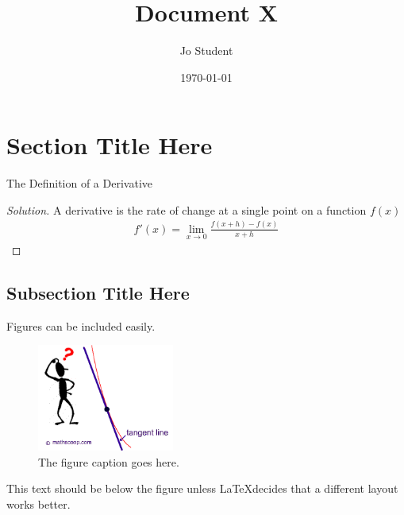 \documentclass[aps,pra,notitlepage,amsmath,amssymb,letterpaper,12pt]{revtex4-1}
\newenvironment{problem}[2][Problem]{\begin{trivlist}
\item[\hskip \labelsep {\bfseries #1}\hskip \labelsep {\bfseries #2.}]}{\end{trivlist}}
\newenvironment{solution}{\begin{proof}[Solution]}{\end{proof}}
\begin{document}
 
\title{Document X}
\author{Jo Student}
\date{\today}

\maketitle

\section{Section Title Here} %

\begin{problem}{1.2} 
The Definition of a Derivative
\end{problem}
 
\begin{solution} %
A derivative is the rate of change at a single point on a function $f(x)$ 
\begin{align}
f'(x) = \lim_{x \rightarrow 0} \frac{f(x+h)-f(x)}{x+h}
\end{align}
\end{solution}

\subsection{Subsection Title Here} %

Figures can be included easily.

\begin{figure}[h!] %
  \includegraphics[width=0.4\textwidth]{1.png}  %
  \caption{The figure caption goes here.}
  \label{fig:figlabel}
\end{figure}

This text should be below the figure unless \LaTeX  decides that a different layout works better.
 
 
\end{document}
